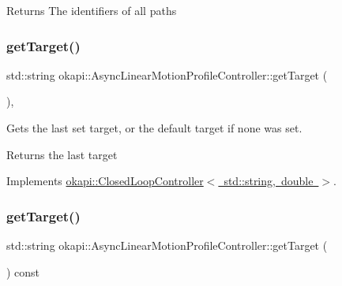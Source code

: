 \begin{DoxyReturn}{Returns}
The identifiers of all paths 
\end{DoxyReturn}
\mbox{\label{classokapi_1_1AsyncLinearMotionProfileController_afc9a1b30a5fd499c38455e8b05982be9}} 
\subsubsection{\texorpdfstring{getTarget()}{getTarget()}\hspace{0.1cm}{\footnotesize\ttfamily [1/2]}}
{\footnotesize\ttfamily std\+::string okapi\+::\+Async\+Linear\+Motion\+Profile\+Controller\+::get\+Target (\begin{DoxyParamCaption}{ }\end{DoxyParamCaption})\hspace{0.3cm}{\ttfamily [override]}, {\ttfamily [virtual]}}

Gets the last set target, or the default target if none was set.

\begin{DoxyReturn}{Returns}
the last target 
\end{DoxyReturn}


Implements \mbox{\hyperlink{classokapi_1_1ClosedLoopController_a22012bedbfaff6e5a3a508f274ec2497}{okapi\+::\+Closed\+Loop\+Controller$<$ std\+::string, double $>$}}.

\mbox{\label{classokapi_1_1AsyncLinearMotionProfileController_accae83d74f347e9a839eeae9d2693917}} 
\subsubsection{\texorpdfstring{getTarget()}{getTarget()}\hspace{0.1cm}{\footnotesize\ttfamily [2/2]}}
{\footnotesize\ttfamily std\+::string okapi\+::\+Async\+Linear\+Motion\+Profile\+Controller\+::get\+Target (\begin{DoxyParamCaption}{ }\end{DoxyParamCaption}) const\hspace{0.3cm}{\ttfamily [virtual]}}

